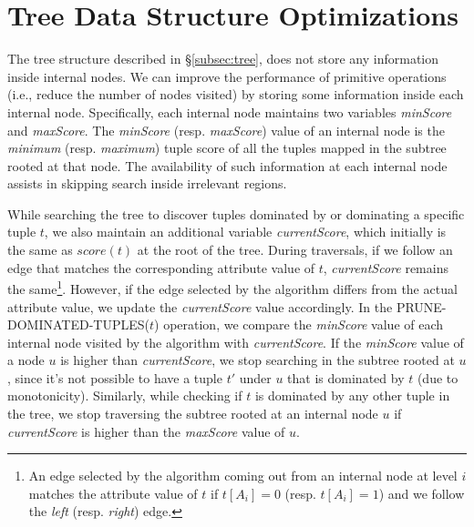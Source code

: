 \appendix

\section{Tree Data Structure Optimizations}\label{ap:tree-optimizations}

\vspace{1mm}
 The tree structure described in \S\ref{subsec:tree}, does not store any information inside internal nodes. We can improve the performance of primitive operations (i.e., reduce the number of nodes visited) by storing some information inside each internal node. Specifically, each internal node maintains two variables \textit{minScore} and \textit{maxScore}. The \textit{minScore} (resp. \textit{maxScore}) value of an internal node is the \textit{minimum} (resp. \textit{maximum}) tuple score of all the tuples mapped in the subtree rooted at that node. The availability of such information at each internal 
node assists in skipping search inside irrelevant regions.

While searching the tree to discover tuples dominated by or dominating a specific tuple $t$, we also maintain an additional variable \textit{currentScore}, which initially is the same as $score(t)$ at the root of the tree. During traversals, if we follow an edge that matches the corresponding attribute value of $t$, \textit{currentScore} remains the same\footnote{An edge selected by the algorithm coming out from an internal node at level $i$ matches the attribute value of $t$ if $t[A_i] = 0$ (resp. $t[A_i] = 1$) and we follow the \textit{left} (resp. \textit{right}) edge.}. However, if the edge selected by the algorithm differs from the actual attribute value, we update the \textit{currentScore} value accordingly. In the PRUNE-DOMINATED-TUPLES($t$) operation, we compare the \textit{minScore} value of each internal node visited by the algorithm with \textit{currentScore}. If the \textit{minScore} value of a node $u$ is higher than \textit{currentScore}, we stop searching in the subtree rooted at $u$, since it's not possible to have a tuple $t'$ under $u$ that is dominated by $t$ (due to monotonicity). Similarly, while checking if $t$ is dominated by any other tuple in the tree, we stop traversing the subtree rooted at an internal node $u$ if \textit{currentScore} is higher than the \textit{maxScore} value of $u$.

